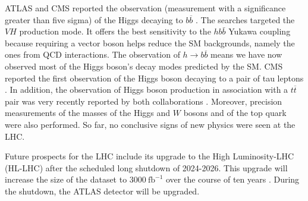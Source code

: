 ATLAS and CMS reported the observation (measurement with a significance greater than five sigma) of the Higgs decaying to $b\overline{b}$ \cite{ATLASh2bb_discovery, CMSh2bb_discovery}. The searches targeted the $VH$ production mode. It offers the best sensitivity to the $hb\bar{b}$ Yukawa coupling because requiring a vector boson helps reduce the SM backgrounds, namely the ones from QCD interactions. The observation of $h\rightarrow b\overline{b}$ means we have now observed most of the Higgs boson's decay modes predicted by the SM. CMS reported the first observation of the Higgs boson decaying to a pair of tau leptons \cite{CMSh2tautau}. In addition, the observation of Higgs boson production in association with a $t\overline{t}$ pair was very recently reported by both collaborations \cite{CMStth, ATLAStth}. Moreover, precision measurements of the masses of the Higgs \cite{ATLAShMass,hMass} and $W$ \cite{ATLASwMass} bosons and of the top quark \cite{ATLAStopMass, CMStopMass} were also performed. 
So far, no conclusive signs of new physics were seen at the LHC.

Future prospects for the LHC include its upgrade to the High Luminosity-LHC (HL-LHC) after
the scheduled long shutdown of 2024-2026. This upgrade will increase the size of the dataset to $3000~\text{fb}^{-1}$ over the course of ten years \cite{High-Luminosity}. 
During the shutdown, the ATLAS detector will be upgraded. 



